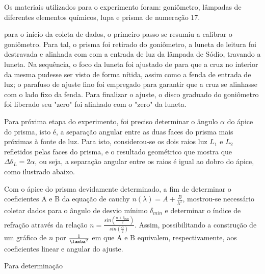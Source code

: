 Os materiais utilizados para o experimento foram: goniômetro, lâmpadas de diferentes elementos químicos, lupa e prisma de numeração 17.

para  o início da coleta de dados, o primeiro passo se resumiu a calibrar o goniômetro. Para tal, o prisma foi retirado do goniômetro, a luneta de leitura foi destravada e alinhada com com a entrada de luz da lâmpada de Sódio, travando a luneta. Na sequência, o foco da luneta foi ajustado de para que a cruz no interior da mesma pudesse ser visto de forma nítida, assim como a fenda de entrada de luz; o parafuso de ajuste fino foi empregado para garantir que a cruz se alinhasse com o lado fixo da fenda. Para finalizar o ajuste, o disco graduado do goniômetro foi liberado seu "zero" foi alinhado com o "zero" da luneta.

Para próxima etapa do experimento, foi preciso determinar o ângulo $\alpha$ do ápice do prisma, isto é, a separação angular entre as duas faces do prisma mais próximas à fonte de luz. Para isto, considerou-se os dois raios luz $L_1$ e $L_2$ refletidos pelas faces do prisma, e o resultado geométrico que mostra que $\Delta \theta_L = 2\alpha$, ou seja, a separação angular entre os raios é igual ao dobro do ápice, como ilustrado abaixo.



Com o ápice do prisma devidamente determinado, a fim de determinar o coeficientes A e B da equação de cauchy $n(\lambda) = A + \frac{B}{\lambda^2}$, mostrou-se necessário coletar dados para o ângulo de desvio mínimo $\delta_{min}$ e determinar o índice de refração através da relação $n = \frac{sin(\frac{\alpha + \delta_{min}}{2})}{sin(\frac{\alpha}{2})}$. Assim, possibilitando a construção de um gráfico de $n$ por $\frac{1}{\lamba^2}$ em que A e B equivalem, respectivamente, aos coeficientes linear e angular do ajuste. 

Para determinação




